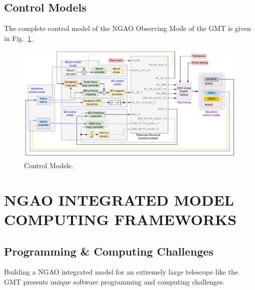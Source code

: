 \documentclass[]{AO4ELT}  %
\begin{document}
\clearpage

\subsection{Control Models}
\label{sec:control}

The complete control model of the NGAO Observing Mode of the GMT is given in Fig.~\ref{fig:15}.

\begin{figure}
   \centering
   \includegraphics[width=\linewidth]{end2end_ngao-ngao-im-e2e.drawio.pdf}
   \caption{Control Models.}
   \label{fig:15}
\end{figure}

\section{NGAO INTEGRATED MODEL COMPUTING FRAMEWORKS}
\label{sec:framework}

\subsection{Programming \& Computing Challenges}
\label{sec:pc-challenge}

Building a NGAO integrated model for an extremely large telescope like the GMT presents unique software programming and computing challenges.
\end{document}
